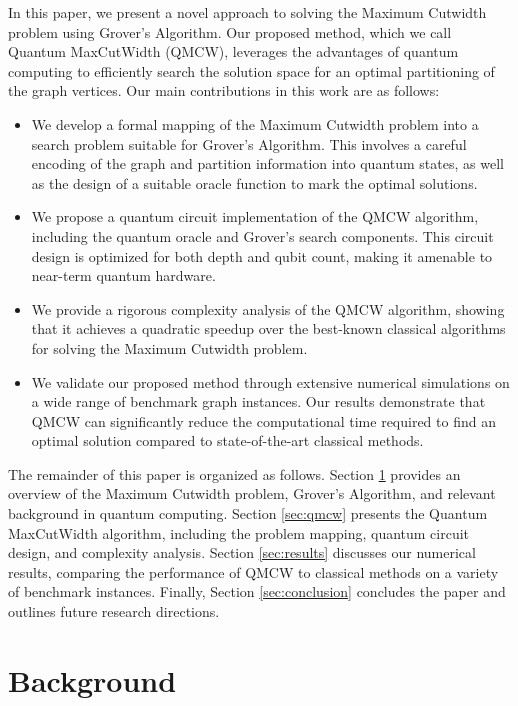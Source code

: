 In this paper, we present a novel approach to solving the Maximum Cutwidth problem using Grover's Algorithm. Our proposed method, which we call Quantum MaxCutWidth (QMCW), leverages the advantages of quantum computing to efficiently search the solution space for an optimal partitioning of the graph vertices. Our main contributions in this work are as follows:

\begin{itemize}
    \item We develop a formal mapping of the Maximum Cutwidth problem into a search problem suitable for Grover's Algorithm. This involves a careful encoding of the graph and partition information into quantum states, as well as the design of a suitable oracle function to mark the optimal solutions.
    
    \item We propose a quantum circuit implementation of the QMCW algorithm, including the quantum oracle and Grover's search components. This circuit design is optimized for both depth and qubit count, making it amenable to near-term quantum hardware.
    
    \item We provide a rigorous complexity analysis of the QMCW algorithm, showing that it achieves a quadratic speedup over the best-known classical algorithms for solving the Maximum Cutwidth problem.
    
    \item We validate our proposed method through extensive numerical simulations on a wide range of benchmark graph instances. Our results demonstrate that QMCW can significantly reduce the computational time required to find an optimal solution compared to state-of-the-art classical methods.
\end{itemize}

The remainder of this paper is organized as follows. Section \ref{sec:background} provides an overview of the Maximum Cutwidth problem, Grover's Algorithm, and relevant background in quantum computing. Section \ref{sec:qmcw} presents the Quantum MaxCutWidth algorithm, including the problem mapping, quantum circuit design, and complexity analysis. Section \ref{sec:results} discusses our numerical results, comparing the performance of QMCW to classical methods on a variety of benchmark instances. Finally, Section \ref{sec:conclusion} concludes the paper and outlines future research directions.

\section{Background}\label{sec:background}

